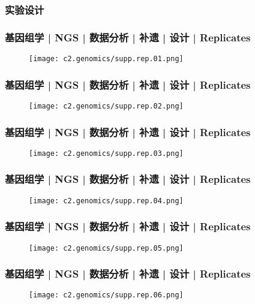 \subsubsection{实验设计}
\begin{frame}
  \frametitle{基因组学 | NGS | 数据分析 | 补遗 | 设计 | Replicates}
  \begin{figure}
    \centering
    \texttt{[image: c2.genomics/supp.rep.01.png]}
  \end{figure}
\end{frame}

\begin{frame}
  \frametitle{基因组学 | NGS | 数据分析 | 补遗 | 设计 | Replicates}
  \begin{figure}
    \centering
    \texttt{[image: c2.genomics/supp.rep.02.png]}
  \end{figure}
\end{frame}

\begin{frame}
  \frametitle{基因组学 | NGS | 数据分析 | 补遗 | 设计 | Replicates}
  \begin{figure}
    \centering
    \texttt{[image: c2.genomics/supp.rep.03.png]}
  \end{figure}
\end{frame}

\begin{frame}
  \frametitle{基因组学 | NGS | 数据分析 | 补遗 | 设计 | Replicates}
  \begin{figure}
    \centering
    \texttt{[image: c2.genomics/supp.rep.04.png]}
  \end{figure}
\end{frame}

\begin{frame}
  \frametitle{基因组学 | NGS | 数据分析 | 补遗 | 设计 | Replicates}
  \begin{figure}
    \centering
    \texttt{[image: c2.genomics/supp.rep.05.png]}
  \end{figure}
\end{frame}

\begin{frame}
  \frametitle{基因组学 | NGS | 数据分析 | 补遗 | 设计 | Replicates}
  \begin{figure}
    \centering
    \texttt{[image: c2.genomics/supp.rep.06.png]}
  \end{figure}
\end{frame}

